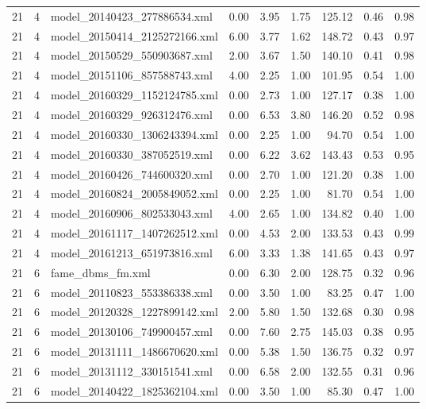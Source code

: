 \begin{table}[ht]
\begin{tabular}{rrlrrrrrr}
   21 &   4 & model\_20140423\_277886534.xml & 0.00 & 3.95 & 1.75 & 125.12 & 0.46 & 0.98 \\ 
   21 &   4 & model\_20150414\_2125272166.xml & 6.00 & 3.77 & 1.62 & 148.72 & 0.43 & 0.97 \\ 
   21 &   4 & model\_20150529\_550903687.xml & 2.00 & 3.67 & 1.50 & 140.10 & 0.41 & 0.98 \\ 
   21 &   4 & model\_20151106\_857588743.xml & 4.00 & 2.25 & 1.00 & 101.95 & 0.54 & 1.00 \\ 
   21 &   4 & model\_20160329\_1152124785.xml & 0.00 & 2.73 & 1.00 & 127.17 & 0.38 & 1.00 \\ 
   21 &   4 & model\_20160329\_926312476.xml & 0.00 & 6.53 & 3.80 & 146.20 & 0.52 & 0.98 \\ 
   21 &   4 & model\_20160330\_1306243394.xml & 0.00 & 2.25 & 1.00 & 94.70 & 0.54 & 1.00 \\ 
   21 &   4 & model\_20160330\_387052519.xml & 0.00 & 6.22 & 3.62 & 143.43 & 0.53 & 0.95 \\ 
   21 &   4 & model\_20160426\_744600320.xml & 0.00 & 2.70 & 1.00 & 121.20 & 0.38 & 1.00 \\ 
   21 &   4 & model\_20160824\_2005849052.xml & 0.00 & 2.25 & 1.00 & 81.70 & 0.54 & 1.00 \\ 
   21 &   4 & model\_20160906\_802533043.xml & 4.00 & 2.65 & 1.00 & 134.82 & 0.40 & 1.00 \\ 
   21 &   4 & model\_20161117\_1407262512.xml & 0.00 & 4.53 & 2.00 & 133.53 & 0.43 & 0.99 \\ 
   21 &   4 & model\_20161213\_651973816.xml & 6.00 & 3.33 & 1.38 & 141.65 & 0.43 & 0.97 \\ 
   21 &   6 & fame\_dbms\_fm.xml & 0.00 & 6.30 & 2.00 & 128.75 & 0.32 & 0.96 \\ 
   21 &   6 & model\_20110823\_553386338.xml & 0.00 & 3.50 & 1.00 & 83.25 & 0.47 & 1.00 \\ 
   21 &   6 & model\_20120328\_1227899142.xml & 2.00 & 5.80 & 1.50 & 132.68 & 0.30 & 0.98 \\ 
   21 &   6 & model\_20130106\_749900457.xml & 0.00 & 7.60 & 2.75 & 145.03 & 0.38 & 0.95 \\ 
   21 &   6 & model\_20131111\_1486670620.xml & 0.00 & 5.38 & 1.50 & 136.75 & 0.32 & 0.97 \\ 
   21 &   6 & model\_20131112\_330151541.xml & 0.00 & 6.58 & 2.00 & 132.55 & 0.31 & 0.96 \\ 
   21 &   6 & model\_20140422\_1825362104.xml & 0.00 & 3.50 & 1.00 & 85.30 & 0.47 & 1.00 \\ 

\end{tabular}
\end{table}
